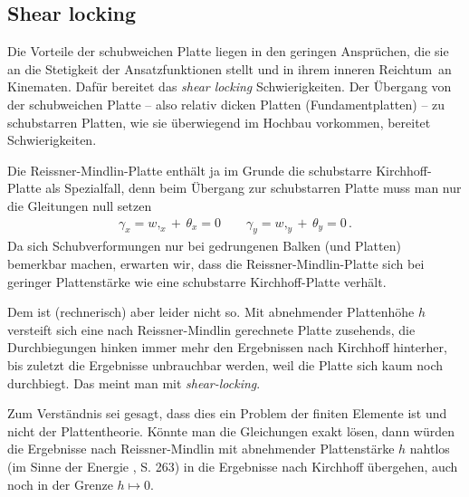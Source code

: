 {\textcolor{sectionTitleBlue}{\subsection{Shear locking}}}
Die Vorteile der schubweichen Platte liegen in den geringen Anspr\"{u}chen, die sie an die Stetigkeit der Ansatzfunktionen stellt und in ihrem inneren \glq Reichtum\grq\ an Kinematen. Daf\"{u}r bereitet das {\em shear locking\/} Schwierigkeiten. Der \"{U}bergang von der schubweichen Platte -- also relativ dicken Platten (Fundamentplatten) -- zu schubstarren Platten, wie sie \"{u}berwiegend im Hochbau vorkommen, bereitet Schwierigkeiten.

Die Reissner-Mindlin-Platte enth\"{a}lt ja im Grunde die schubstarre Kirch\-hoff-Platte als Spezialfall, denn beim \"{U}bergang zur schubstarren Platte muss man nur die Gleitungen null setzen
\begin{align}
\gamma_x = w,_x + \, \theta_x = 0 \qquad \gamma_y = w,_y + \, \theta_y = 0\,.
\end{align}
Da sich Schubverformungen nur bei gedrungenen Balken (und Platten) bemerkbar machen, erwarten wir, dass die Reissner-Mindlin-Platte sich bei geringer Plattenst\"{a}rke wie eine schubstarre Kirchhoff-Platte verh\"{a}lt.

Dem ist (rechnerisch) aber leider nicht so. Mit abnehmender Plattenh\"{o}he $h$ versteift sich eine nach Reissner-Mindlin gerechnete Platte zusehends, die Durchbiegungen hinken immer mehr den Ergebnissen nach Kirchhoff hinterher, bis zuletzt die Ergebnisse unbrauchbar werden, weil die Platte sich kaum noch durchbiegt. Das meint man mit {\em shear-locking}.

Zum Verst\"{a}ndnis sei gesagt, dass dies ein Problem der finiten Elemente ist und nicht der Plattentheorie. K\"{o}nnte man die Gleichungen exakt l\"{o}sen, dann w\"{u}rden die Ergebnisse nach Reissner-Mindlin mit abnehmender Plattenst\"{a}rke $h$ nahtlos (im Sinne der Energie \cite{Szabo}, S. 263) in die Ergebnisse nach Kirchhoff \"{u}bergehen, auch noch in der Grenze $h \mapsto 0$.\\

